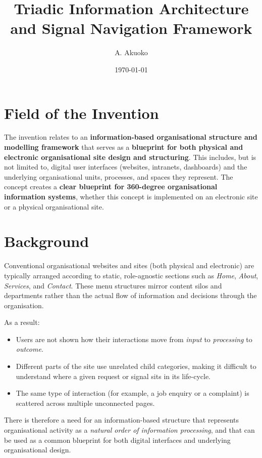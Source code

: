 \documentclass[11pt,a4paper]{article}
\title{Triadic Information Architecture and Signal Navigation Framework}
\author{A. Akuoko}
\date{\today}
\begin{document}
\maketitle

\section*{Field of the Invention}

The invention relates to an \textbf{information-based organisational structure and modelling framework} that serves as a \textbf{blueprint for both physical and electronic organisational site design and structuring}. This includes, but is not limited to, digital user interfaces (websites, intranets, dashboards) and the underlying organisational units, processes, and spaces they represent. The concept creates a \textbf{clear blueprint for 360-degree organisational information systems}, whether this concept is implemented on an electronic site or a physical organisational site.

\section*{Background}

Conventional organisational websites and sites (both physical and electronic) are typically arranged according to static, role-agnostic sections such as \textit{Home}, \textit{About}, \textit{Services}, and \textit{Contact}. These menu structures mirror content silos and departments rather than the actual flow of information and decisions through the organisation.

As a result:
\begin{itemize}[noitemsep]
  \item Users are not shown how their interactions move from \emph{input} to \emph{processing} to \emph{outcome}.
  \item Different parts of the site use unrelated child categories, making it difficult to understand where a given request or signal sits in its life-cycle.
  \item The same type of interaction (for example, a job enquiry or a complaint) is scattered across multiple unconnected pages.
\end{itemize}

There is therefore a need for an information-based structure that represents organisational activity as a \emph{natural order of information processing}, and that can be used as a common blueprint for both digital interfaces and underlying organisational design.
\end{document}
